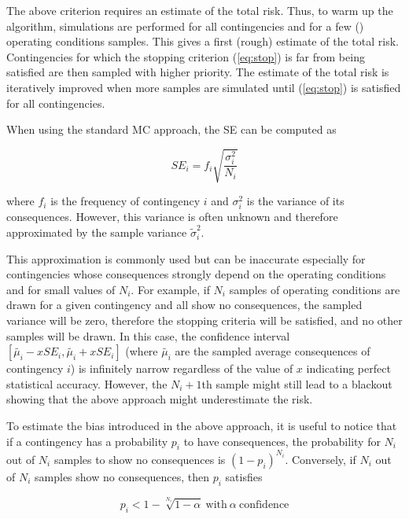 The above criterion requires an estimate of the total risk. Thus, to warm up the algorithm, simulations are performed for all contingencies and for a few () operating conditions samples. This gives a first (rough) estimate of the total risk. Contingencies for which the stopping criterion (\ref{eq:stop}) is far from being satisfied are then sampled with higher priority. The estimate of the total risk is iteratively improved when more samples are simulated until (\ref{eq:stop}) is satisfied for all contingencies.

When using the standard MC approach, the SE can be computed as

\begin{equation}
  \label{eq:SE_classic}
  SE_i = f_i \sqrt{\frac{\sigma_i^2}{N_i}}
\end{equation}

\noindent where \(f_i\) is the frequency of contingency \(i\) and \(\sigma_i^2\) is the variance of its consequences. However, this variance is often unknown and therefore approximated by the sample variance \(\tilde{\sigma}_i^2\).

This approximation is commonly used but can be inaccurate especially for contingencies whose consequences strongly depend on the operating conditions and for small values of \(N_i\). For example, if \(N_i\) samples of operating conditions are drawn for a given contingency and all show no consequences, the sampled variance will be zero, therefore the stopping criteria will be satisfied, and no other samples will be drawn. In this case, the confidence interval \([\tilde{\mu_i} - x SE_i, \tilde{\mu_i} + x SE_i]\) (where \(\tilde{\mu_i}\) are the sampled average consequences of contingency \(i\)) is infinitely narrow regardless of the value of \(x\) indicating perfect statistical accuracy. However, the \(N_i+1\)th sample might still lead to a blackout showing that the above approach might underestimate the risk.

To estimate the bias introduced in the above approach, it is useful to notice that if a contingency has a probability \(p_i\) to have consequences, the probability for \(N_i\) out of \(N_i\) samples to show no consequences is \((1-p_i)^{N_i}\). Conversely, if \(N_i\) out of \(N_i\) samples show no consequences, then \(p_i\) satisfies

\begin{equation} \label{eq:proba}
  p_i < 1 - \sqrt[N_i]{1-\alpha} \ \text{with}\ \alpha \ \text{confidence}
\end{equation}

